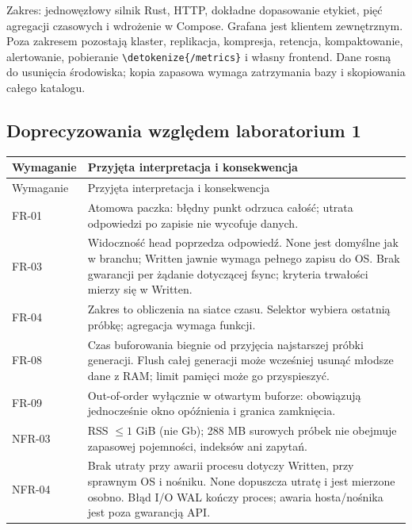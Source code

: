 \documentclass[11pt,a4paper]{article}
\newcommand{\code}[1]{\expandafter\nolinkurl\expandafter{\detokenize{#1}}}
\newcommand{\tabhead}[1]{\toprule #1\\ \midrule\endfirsthead
  \toprule #1\\ \midrule\endhead \bottomrule\endfoot}
\begin{document}
Zakres: jednowęzłowy silnik Rust, HTTP, dokładne dopasowanie etykiet,
pięć agregacji czasowych i wdrożenie w Compose. Grafana
jest klientem zewnętrznym. Poza zakresem pozostają klaster, replikacja,
kompresja, retencja, kompaktowanie, alertowanie, pobieranie
\code{/metrics} i własny frontend. Dane rosną do usunięcia środowiska;
kopia zapasowa wymaga zatrzymania bazy i skopiowania całego katalogu.

\subsection{Doprecyzowania względem laboratorium 1}
\begin{longtable}{P{23mm}P{133mm}}
\tabhead{Wymaganie & Przyjęta interpretacja i konsekwencja}
FR-01 & Atomowa paczka: błędny punkt odrzuca całość; utrata odpowiedzi
po zapisie nie wycofuje danych.\\
FR-03 & Widoczność head poprzedza odpowiedź. None jest domyślne jak
w branchu; Written jawnie wymaga pełnego zapisu do OS. Brak gwarancji
per żądanie dotyczącej fsync; kryteria trwałości mierzy się w Written.\\

FR-04 & Zakres to obliczenia na siatce czasu. Selektor wybiera ostatnią
próbkę; agregacja wymaga funkcji.\\
FR-08 & Czas buforowania biegnie od przyjęcia najstarszej próbki
generacji. Flush całej generacji może wcześniej usunąć młodsze dane
z RAM; limit pamięci może go przyspieszyć.\\
FR-09 & Out-of-order wyłącznie w otwartym buforze: obowiązują
jednocześnie okno opóźnienia i granica zamknięcia.\\
NFR-03 & RSS $\leq1$ GiB (nie Gb); 288 MB surowych próbek nie obejmuje
zapasowej pojemności, indeksów ani zapytań.\\
NFR-04 & Brak utraty przy awarii procesu dotyczy Written, przy sprawnym
OS i nośniku. None dopuszcza utratę i jest mierzone osobno.
Błąd I/O WAL kończy proces; awaria hosta/nośnika jest poza gwarancją API.\\

\end{longtable}
\end{document}
